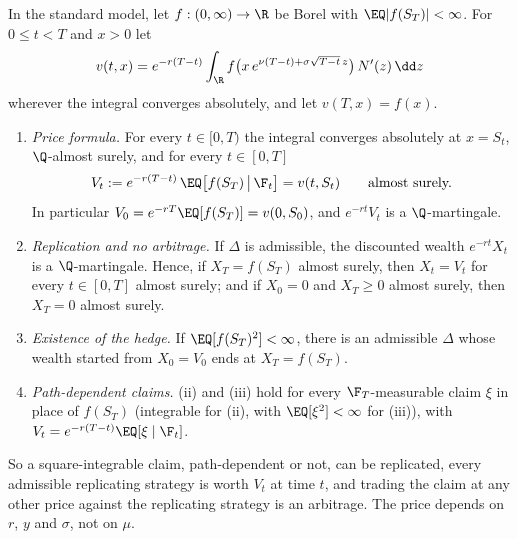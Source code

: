 \begin{proposition}\label{prop:sm-risk-neutral}
In the standard model, let $f:(0,\infty)\to\R$ be Borel with $\EQ|f(S_T)|<\infty$. For $0\le t<T$
and $x>0$ let
\begin{equation}\label{eq:sm-price-function}
  v(t,x)=e^{-r(T-t)}\int_{\R}f\big(x\,e^{\nu(T-t)+\sigma\sqrt{T-t}\,z}\big)\,N'(z)\,\dd z
\end{equation}
wherever the integral converges absolutely, and let $v(T,x)=f(x)$.
\begin{enumerate}[label=(\roman*)]
  \item \emph{Price formula.} For every $t\in[0,T)$ the integral converges absolutely at $x=S_t$,
    $\Q$-almost surely, and for every $t\in[0,T]$
    \begin{equation}\label{eq:sm-price}
      V_t:=e^{-r(T-t)}\,\EQ\big[f(S_T)\,\big|\,\F_t\big]=v(t,S_t)\qquad\text{almost surely.}
    \end{equation}
    In particular $V_0=e^{-rT}\EQ[f(S_T)]=v(0,S_0)$, and $e^{-rt}V_t$ is a $\Q$-martingale.
  \item \emph{Replication and no arbitrage.} If $\Delta$ is admissible, the discounted wealth
    $e^{-rt}X_t$ is a $\Q$-martingale. Hence, if $X_T=f(S_T)$ almost surely, then $X_t=V_t$ for
    every $t\in[0,T]$ almost surely; and if $X_0=0$ and $X_T\ge0$ almost surely, then $X_T=0$
    almost surely.
  \item \emph{Existence of the hedge.} If $\EQ[f(S_T)^2]<\infty$, there is an admissible $\Delta$
    whose wealth started from $X_0=V_0$ ends at $X_T=f(S_T)$.
  \item \emph{Path-dependent claims.} (ii) and (iii) hold for every $\F_T$-measurable claim $\xi$ in
    place of $f(S_T)$ (integrable for (ii), with $\EQ[\xi^2]<\infty$ for (iii)), with
    $V_t=e^{-r(T-t)}\EQ[\xi\mid\F_t]$.
\end{enumerate}
\end{proposition}

So a square-integrable claim, path-dependent or not, can be replicated, every admissible
replicating strategy is worth $V_t$ at time $t$, and trading the claim at any other price against
the replicating strategy is an arbitrage. The price depends on $r$, $y$ and $\sigma$, not on $\mu$.

